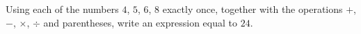 Using each of the numbers $4$, $5$, $6$, $8$ exactly once, together with the operations $+$, $-$, $\times$, $\div$ and parentheses, write an expression equal to $24$.
